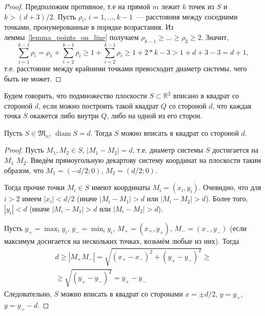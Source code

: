 \begin{proof}
	Предположим противное, т.е на прямой $m$ лежит $k$ точек из $S$ и $k > (d+3)/2$.
	Пусть $\rho_i$, $i = 1,...,k-1$~--- расстояния между соседними точками,
	пронумерованные в порядке возрастания.
	Из леммы~\ref{lemma_points_on_line} получаем $\rho_{k-1}\geq...\geq\rho_2\geq 2$.
	Значит,
	\begin{equation*}
		\sum_{i=1}^{k-1} \rho_i
		=
		\rho_1 + \sum_{i=2}^{k-1} \rho_i
		\geq
		1 + \sum_{i=2}^{k-1} \rho_i
		\geq
		1 + 2*k-3
		>
		1 + d + 3 - 3
		=
		d + 1
		,
	\end{equation*}
	т.е. расстояние между крайними точками превосходит диаметр системы,
	чего быть не может.
\end{proof}

\begin{definition}
	Будем говорить, что подмножество плоскости $S\subset\mathbb{R}^2$
	вписано в квадрат со стороной $d$, если
	можно построить такой квадрат $Q$ со стороной $d$,
	что каждая точка $S$ окажется либо внутри $Q$, либо на одной из его сторон.
\end{definition}

\begin{lemma}
	\label{lemma:square_container}
	Пусть $S\in\mathfrak{M}_n$, $\operatorname{diam} S = d$.
	Тогда $S$ можно вписать в квадрат со стороной $d$.
\end{lemma}

\begin{proof}
	Пусть $M_1, M_2 \in S$, $|M_1 - M_2| = d$,
	т.е. диаметр системы $S$ достигается на $M_1$  $M_2$.
	Введём прямоугольную декартову систему координат на плоскости таким образом, что
	$M_1 = (-d/2; 0)$, $M_2 = (d/2; 0)$.

	Тогда прочие точки $M_i \in S$ имеют координаты $M_i=(x_i, y_i)$.
	Очевидно, что для $i>2$ имеем $|x_i| < d/2$
	(иначе $|M_i - M_1| > d$ или $|M_i - M_2| > d$).
	Более того, $|y_i| < d$ (иначе $|M_i - M_1| > d$ или $|M_i - M_2| > d$).

	Пусть $y_+ = \max_{i} y_i$, $y_- = \min_{i} y_i$, $M_+=(x_+, y_+)$, $M_-=(x_-, y_-)$
	(если максимум досигается на нескольких точках, возьмём любые из них).
	Тогда
	\begin{multline}
		d \geq |M_+ M_-| = \sqrt{(x_+ - x_-)^2 + (y_+ - y_-)^2}
		\geq
		\\\geq
		\sqrt{(y_+ - y_-)^2} =
		y_+ - y_-
	\end{multline}
	Следовательно, $S$ можно вписать в квадрат со сторонами $x=\pm d/2$,
	$y=y_+$, $y=y_+ - d$.
\end{proof}

